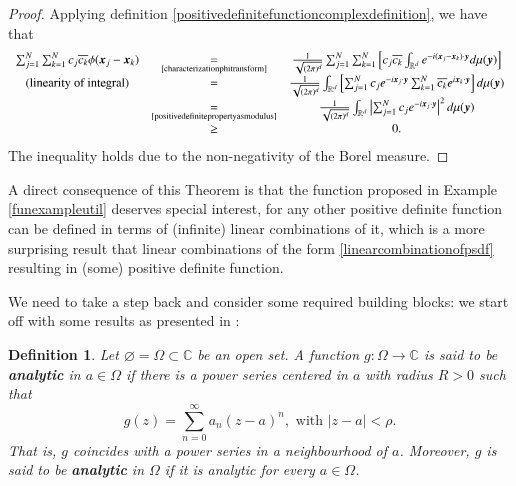\documentclass[12pt]{report} %
\newtheorem{definition}{Definition}
\newcommand{\tmmathbf}[1]{\ensuremath{\boldsymbol{#1}}}
\newcommand{\tmstrong}[1]{\textbf{#1}}
\providecommand{\xequal}[2][]{\mathop{=}\limits_{#1}^{#2}}
\begin{document}
\begin{proof}
  Applying definition \eqref{positivedefinitefunctioncomplexdefinition}, we
  have that
  \[ \begin{array}{ccc}
       \sum_{j = 1}^N \sum_{k = 1}^N c_j \overline{c_k} \phi (\tmmathbf{x}_j
       -\tmmathbf{x}_k) &
       \xequal[\text{\eqref{characterizationphitransform}}]{} &
       \frac{1}{\sqrt{(2 \pi)^d}} \sum_{j = 1}^N \sum_{k = 1}^N \left[ c_j
       \overline{c_k} \int_{\mathbb{R}^d} e^{- i (\tmmathbf{x}_j
       -\tmmathbf{x}_k) \cdot \tmmathbf{y}} d \mu (\tmmathbf{y}) \right]\\
       \text{(linearity of integral)} & = & \frac{1}{\sqrt{(2 \pi)^d}}
       \int_{\mathbb{R}^d} \left[ \sum_{j = 1}^N c_j e^{- i\tmmathbf{x}_j
       \cdot \tmmathbf{y}} \sum_{k = 1}^N \overline{c_k} e^{i\tmmathbf{x}_k
       \cdot \tmmathbf{y}} \right] d \mu (\tmmathbf{y})\\
       & \xequal[\text{\eqref{positivedefinitepropertyasmodulus}}]{} &
       \frac{1}{\sqrt{(2 \pi)^d}} \int_{\mathbb{R}^d} \left| \sum_{j = 1}^N
       c_j e^{- i\tmmathbf{x}_j \cdot \tmmathbf{y}} \right|^2 d \mu
       (\tmmathbf{y})\\
       & \geq & 0.
     \end{array} \]
  The inequality holds due to the non-negativity of the Borel measure.
\end{proof}

A direct consequence of this Theorem is that the function proposed in Example
\ref{funexampleutil} deserves special interest, for any other positive
definite function can be defined in terms of (infinite) linear combinations of
it, which is a more surprising result that linear combinations of the form
\eqref{linearcombinationofpsdf} resulting in (some) positive definite
function.

{}


We need to take a step back and consider some required building blocks: we
start off with some results as presented in {\cite{titchmarsh1939theory}}:

\begin{definition}
  Let $\varnothing = \Omega \subset \mathbb{C}$ be an open set. A function $g
  : \Omega \rightarrow \mathbb{C}$ is said to be {\tmstrong{analytic}} in $a
  \in \Omega$ if there is a power series centered in $a$ with radius $R > 0$
  such that
  \begin{equation}
    g (z) = \sum_{n = 0}^{\infty} a_n (z - a)^n
    \label{analyticasseriedepotencia}, \text{ with } | z - a | < \rho .
  \end{equation}
  That is, $g$ coincides with a power series in a neighbourhood of $a$.
  Moreover, $g$ is said to be {\tmstrong{analytic}} in $\Omega$ if it is
  analytic for every $a \in \Omega$.
\end{definition}
\end{document}
